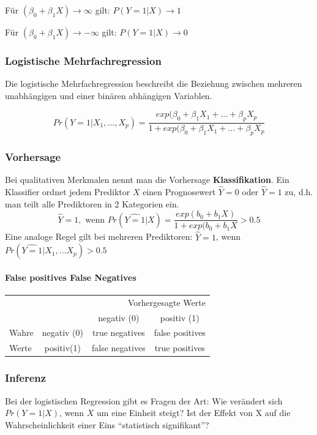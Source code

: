 \documentclass[a3paper, 8pt]{extarticle}
\begin{document}
\begin{multicols*}{5}
\begin{enumerate}
Für $(\beta_0+\beta_1X)\to \infty$ gilt: $P(Y=1 | X) \to 1$

Für $(\beta_0+\beta_1X)\to -\infty$ gilt: $P(Y=1 | X) \to 0$


\subsubsection{Logistische Mehrfachregression}
Die logistische Mehrfachregression beschreibt die Beziehung zwischen mehreren unabhängigen und einer binären abhängigen Variablen.

$$Pr(Y=1|X_1, \dots, X_p)=\frac{exp(\beta_0+\beta_1X_1+ \dots + \beta_pX_p}{1+exp(\beta_0+\beta_1X_1+ \dots + \beta_pX_p}$$
\subsubsection{Vorhersage}
Bei qualitativen Merkmalen nennt man die Vorhersage \textbf{Klassifikation}. Ein Klassifier ordnet jedem Prediktor $X$ einen Prognosewert $\hat{Y}= 0$ oder $\hat{Y}=1$ zu, d.h. man teilt alle Prediktoren in 2 Kategorien ein.
$$\hat{Y}=1, \text{ wenn }Pr(\widehat{Y=1}|X)=\frac{exp(b_0+b_1X)}{1+exp(b_0+b_1X}>0.5$$
Eine analoge Regel gilt bei mehreren Prediktoren: 
$\hat{Y}=1$,  wenn $Pr(\widehat{Y=1}|X_1, \dots X_p) >0.5$

\paragraph{False positives False Negatives}

\begin{center}
    \begin{tabular}{l c|c|c}
          &  \multicolumn{3}{r}{Vorhergesagte Werte} \\
          & & negativ (0) & positiv (1) \\ \cline{2-4}
          Wahre & negativ (0) & true negatives & false positives \\ \cline{2-4} Werte & positiv(1) & false negatives & true positives
    \end{tabular}
\end{center}
\subsubsection{Inferenz}
Bei der logistischen Regression gibt es Fragen der Art: Wie verändert sich $Pr(Y = 1|X)$, wenn $X$ um eine Einheit steigt? Ist der Effekt von X auf die Wahrscheinlichkeit einer Eins “statistisch signifikant”?



\end{enumerate}
\end{multicols*}
\end{document}
